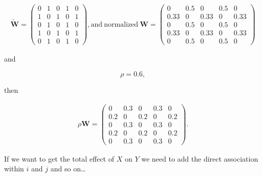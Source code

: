 \documentclass[
  letterpaper,
]{scrbook}
\begin{document}
\[
\begin{split}
\tilde{\boldsymbol{\mathbf{W}}} = \begin{pmatrix}
      0 & 1 & 0 & 1 & 0 \\
      1 & 0 & 1 & 0 & 1 \\
      0 & 1 & 0 & 1 & 0 \\
      1 & 0 & 1 & 0 & 1 \\
      0 & 1 & 0 & 1 & 0
      \end{pmatrix}, \mathrm{and~normalized} ~
\boldsymbol{\mathbf{W}} = \begin{pmatrix}
      0 & 0.5 & 0 & 0.5 & 0 \\
      0.33 & 0 & 0.33 & 0 & 0.33 \\
      0 & 0.5 & 0 & 0.5 & 0 \\
      0.33 & 0 & 0.33 & 0 & 0.33 \\
      0 & 0.5 & 0 & 0.5 & 0
      \end{pmatrix}      
\end{split}
\]

and

\[
\rho = 0.6,
\]

then

\[
\begin{split}
\rho \boldsymbol{\mathbf{W}} = \begin{pmatrix}
      0 & 0.3 & 0 & 0.3 & 0 \\
      0.2 & 0 & 0.2 & 0 & 0.2 \\
      0 & 0.3 & 0 & 0.3 & 0 \\
      0.2 & 0 & 0.2 & 0 & 0.2 \\
      0 & 0.3 & 0 & 0.3 & 0
      \end{pmatrix}.
\end{split}
\]

If we want to get the total effect of \(X\) on \(Y\) we need to add the
direct association within \(i\) and \(j\) and so on\ldots{}
\end{document}
